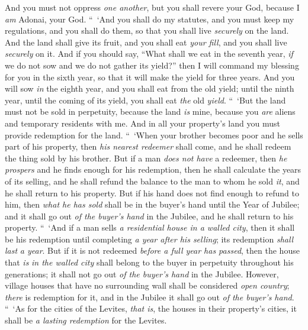 \begin{biblechapter}
\verse And you must not oppress \textit{one another}, but you shall revere your God, because I \textit{am} Adonai, your God.
\verse “ ‘And you shall do my statutes, and you must keep my regulations, and you shall do them, so that you shall live \textit{securely} on the land.
\verse And the land shall give its fruit, and you shall eat \textit{your fill}, and you shall live \textit{securely} on it.
\verse And if you should say, “What shall we eat in the seventh year, \textit{if} we do not sow and we do not gather its yield?”
\verse then I will command my blessing for you in the sixth year, so that it will make the yield for three years.
\verse And you will sow \textit{in} the eighth year, and you shall eat from the old yield; until the ninth year, until the coming of its yield, you shall eat \textit{the} old \textit{yield}.
\verse “ ‘But the land must not be sold in perpetuity, because the land \textit{is} mine, because you \textit{are} aliens and temporary residents with me.
\verse And in all your property’s land you must provide redemption for the land.
\verse “ ‘When your brother becomes poor and he sells part of his property, then \textit{his nearest redeemer} shall come, and he shall redeem the thing sold by his brother.
\verse But if a man \textit{does not have} a redeemer, then \textit{he prospers} and he finds enough for his redemption,
\verse then he shall calculate the years of its selling, and he shall refund the balance to the man to whom he sold \textit{it}, and he shall return to his property.
\verse But if his hand does not find enough to refund to him, then \textit{what he has sold} shall be in the buyer’s hand until the Year of Jubilee; and it shall go out \textit{of the buyer’s hand} in the Jubilee, and he shall return to his property.
\verse “ ‘And if a man sells \textit{a residential house in a walled city}, then it shall be his redemption until completing \textit{a year after his selling}; its redemption \textit{shall last} \textit{a year}.
\verse But if it is not redeemed \textit{before a full year has passed}, then the house that \textit{is} \textit{in the walled city} shall belong to the buyer in perpetuity throughout his generations; it shall not go out \textit{of the buyer’s hand} in the Jubilee.
\verse However, village houses that have no surrounding wall shall be considered \textit{open country}; \textit{there} is redemption for it, and in the Jubilee it shall go out \textit{of the buyer’s hand}.
\verse “ ‘As for the cities of the Levites, \textit{that is}, the houses in their property’s cities, it shall be \textit{a lasting redemption} for the Levites.

\end{biblechapter}
